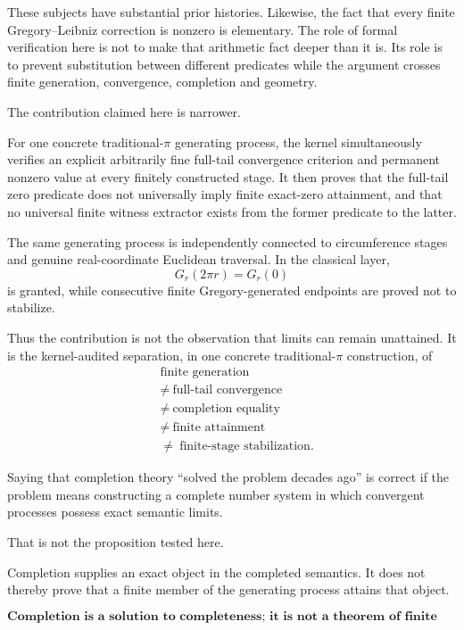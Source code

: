 \documentclass[11pt,a4paper]{article}
\begin{document}
These subjects have substantial prior histories. Likewise, the fact
that every finite Gregory--Leibniz correction is nonzero is elementary.
The role of formal verification here is not to make that arithmetic
fact deeper than it is. Its role is to prevent substitution between
different predicates while the argument crosses finite generation,
convergence, completion and geometry.

The contribution claimed here is narrower.

For one concrete traditional-\(\pi\) generating process, the kernel
simultaneously verifies an explicit arbitrarily fine full-tail
convergence criterion and permanent nonzero value at every finitely
constructed stage. It then proves that the full-tail zero predicate
does not universally imply finite exact-zero attainment, and that no
universal finite witness extractor exists from the former predicate to
the latter.

The same generating process is independently connected to
circumference stages and genuine real-coordinate Euclidean traversal.
In the classical layer,
\[
G_r(2\pi r)=G_r(0)
\]
is granted, while consecutive finite Gregory-generated endpoints are
proved not to stabilize.

Thus the contribution is not the observation that limits can remain
unattained. It is the kernel-audited separation, in one concrete
traditional-\(\pi\) construction, of
\[
\boxed{
\begin{aligned}
&\text{finite generation}\\
&\neq\ \text{full-tail convergence}\\
&\neq\ \text{completion equality}\\
&\neq\ \text{finite attainment}\\
&\neq\ \text{finite-stage stabilization}.
\end{aligned}
}
\]

Saying that completion theory ``solved the problem decades ago'' is
correct if the problem means constructing a complete number system in
which convergent processes possess exact semantic limits.

That is not the proposition tested here.

Completion supplies an exact object in the completed semantics. It
does not thereby prove that a finite member of the generating process
attains that object.

\[
\boxed{
\textbf{Completion is a solution to completeness;
it is not a theorem of finite attainment.}
}
\]
\end{document}
